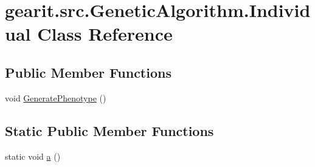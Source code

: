 \hypertarget{classgearit_1_1src_1_1_genetic_algorithm_1_1_individual}{\section{gearit.\+src.\+Genetic\+Algorithm.\+Individual Class Reference}
\label{classgearit_1_1src_1_1_genetic_algorithm_1_1_individual}
}
\subsection*{Public Member Functions}
\begin{DoxyCompactItemize}
\item 
void \hyperlink{classgearit_1_1src_1_1_genetic_algorithm_1_1_individual_a1f8643e771c00e8b595a4b26c04f5aa9}{Generate\+Phenotype} ()
\end{DoxyCompactItemize}
\subsection*{Static Public Member Functions}
\begin{DoxyCompactItemize}
\item 
static void \hyperlink{classgearit_1_1src_1_1_genetic_algorithm_1_1_individual_a398052837c3849f98b2348c1ab68cbbd}{a} ()
\end{DoxyCompactItemize}



